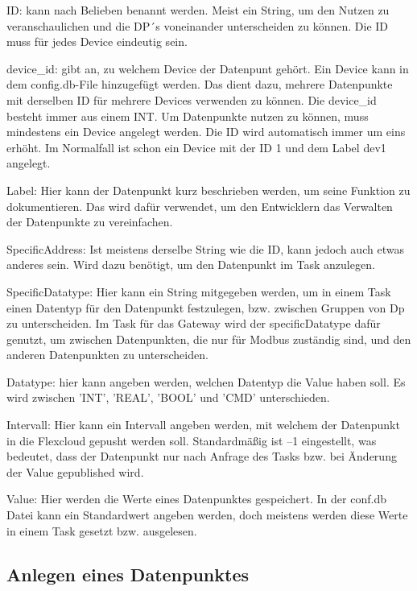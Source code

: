 \begin{compactitem}
    \item ID: kann nach Belieben benannt werden. Meist ein String, um den Nutzen zu veranschaulichen und die DP´s voneinander unterscheiden zu können. Die ID muss für jedes Device eindeutig sein. \label{text:deviceId}
    \item device\_id: gibt an, zu welchem Device der Datenpunt gehört. Ein Device kann in dem config.db-File hinzugefügt werden. Das dient dazu, mehrere Datenpunkte mit derselben ID für mehrere Devices verwenden zu können. Die device\_id besteht immer aus einem INT. Um Datenpunkte nutzen zu können, muss mindestens ein Device angelegt werden. Die ID wird automatisch immer um eins erhöht. Im Normalfall ist schon ein Device mit der ID 1 und dem Label dev1 angelegt.
    \item Label: Hier kann der Datenpunkt kurz beschrieben werden, um seine Funktion zu dokumentieren. Das wird dafür verwendet, um den Entwicklern das Verwalten der Datenpunkte zu vereinfachen.
    \item SpecificAddress: Ist meistens derselbe String wie die ID, kann jedoch auch etwas anderes sein. Wird dazu benötigt, um den Datenpunkt im Task anzulegen.
    \item SpecificDatatype: Hier kann ein String mitgegeben werden, um in einem Task einen Datentyp für den Datenpunkt festzulegen, bzw. zwischen Gruppen von Dp zu unterscheiden. Im Task für das Gateway wird der specificDatatype dafür genutzt, um zwischen Datenpunkten, die nur für Modbus zuständig sind, und den anderen Datenpunkten zu unterscheiden. \label{text:specificDatatype}
    \item Datatype: hier kann angeben werden, welchen Datentyp die Value haben soll. Es wird zwischen 'INT', 'REAL', 'BOOL' und 'CMD' unterschieden.
    \item Intervall: Hier kann ein Intervall angeben werden, mit welchem der Datenpunkt in die Flexcloud gepusht werden soll. Standardmäßig ist –1 eingestellt, was bedeutet, dass der Datenpunkt nur nach Anfrage des Tasks bzw. bei Änderung der Value gepublished wird.
    \item Value: Hier werden die Werte eines Datenpunktes gespeichert. In der conf.db Datei kann ein Standardwert angeben werden, doch meistens werden diese Werte in einem Task gesetzt bzw. ausgelesen.
\end{compactitem}

\subsection{Anlegen eines Datenpunktes} 


